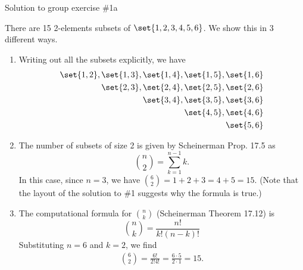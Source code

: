 \documentclass[10pt]{beamer}
\begin{document}
\begin{frame}{Solution to group exercise \#1a}
\footnotesize

 There are 15 2-elements subsets of $\set{1,2,3,4,5,6}$.  We show this in 3 different ways. 
\begin{enumerate} 
	\item Writing out all the subsets explicitly, we have
%
\begin{align*}
\set{1,2}, \set{1,3}, \set{1,4}, \set{1,5}, \set{1,6} \\
\set{2,3}, \set{2,4}, \set{2,5}, \set{2,6} \\
\set{3,4}, \set{3,5}, \set{3,6} \\
\set{4,5}, \set{4,6} \\
\set{5,6} 
\end{align*}
%
\item The number of subsets of size 2 is given by Scheinerman Prop. 17.5 as 
\[ \binom{n}{2} = \sum_{k=1}^{n-1} k. \]
In this case, since $n=3$, we have $ \binom{6}{2} = 1+2+3=4+5 = 15.$
(Note that the layout of the solution to \#1 suggests why the formula is true.) 
\item The computational formula for $\binom{n}{k}$ (Scheinerman Theorem 17.12) is 
\[ \binom{n}{k}  = \frac{n!}{k! (n-k)!}\] 
Substituting $n=6$ and $k=2$, we find
%
\begin{align*}
\binom{6}{2} = \frac{6!}{2!4!} = \frac{6 \cdot 5}{2 \cdot 1} = 15. 
\end{align*}
\end{enumerate}
\end{frame}
\end{document}
